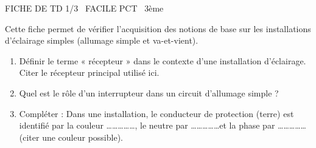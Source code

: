 \documentclass[11pt]{article}
\begin{document}
\begin{tcolorbox}[enhanced,colback=popink,colframe=popink,arc=10pt,boxrule=0pt,left=12pt,right=12pt,top=9pt,bottom=9pt]
{\color{white}\popxbold\small FICHE DE TD 1/3 \textbullet\ FACILE \hfill PCT \textbullet\ 3ème\par}
\end{tcolorbox}
\vspace{4pt}
Cette fiche permet de vérifier l'acquisition des notions de base sur les installations d'éclairage simples (allumage simple et va-et-vient).

\begin{exercice}
\begin{enumerate}
    \item Définir le terme « récepteur » dans le contexte d'une installation d'éclairage. Citer le récepteur principal utilisé ici.
    \item Quel est le rôle d'un interrupteur dans un circuit d'allumage simple ?
    \item Compléter : Dans une installation, le conducteur de protection (terre) est identifié par la couleur \ldots\ldots\ldots\ldots\ldots, le neutre par \ldots\ldots\ldots\ldots\ldots et la phase par \ldots\ldots\ldots\ldots\ldots (citer une couleur possible).
\end{enumerate}
\end{exercice}
\end{document}
